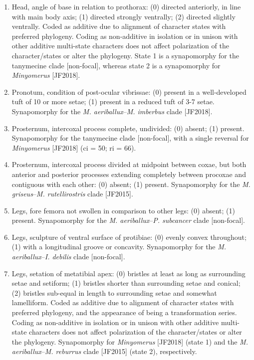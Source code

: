\documentclass[fleqn,10pt,lineno]{wlpeerj} %
\begin{document}
\begin{enumerate}
	 	\item Head, angle of base in relation to prothorax: (0) directed anteriorly, in line with main body axis; (1) directed strongly ventrally; (2) directed slightly ventrally. Coded as additive due to alignment of character states with preferred phylogeny. Coding as non-additive in isolation or in unison with other additive multi-state characters does not affect polarization of the character/states or alter the phylogeny. State 1 is a synapomorphy for the tanymecine clade [non-focal], whereas state 2 is a synapomorphy for \textit{Minyomerus} [JF2018].
	 	
	 	\item Pronotum, condition of post-ocular vibrissae: (0) present in a well-developed tuft of 10 or more setae; (1) present in a reduced tuft of 3-7 setae. Synapomorphy for the \textit{M. aeriballux}--\textit{M. imberbus} clade [JF2018].
	 	
	 	\item Prosternum, intercoxal process complete, undivided: (0) absent; (1) present. Synapomorphy for the tanymecine clade [non-focal], with a single reversal for \textit{Minyomerus} [JF2018] (ci = 50; ri = 66).
	 	
	 	\item Prosternum, intercoxal process divided at midpoint between coxae, but both anterior and posterior processes extending completely between procoxae and contiguous with each other: (0) absent; (1) present. Synapomorphy for the \textit{M. griseus}--\textit{M. rutellirostris} clade [JF2015].
		
	 	\item Legs, fore femora not swollen in comparison to other legs: (0) absent; (1) present. Synapomorphy for the \textit{M. aeriballux}--\textit{P. subcancer} clade [non-focal].
	 	
	 	\item Legs, sculpture of ventral surface of protibiae: (0) evenly convex throughout; (1) with a longitudinal groove or concavity. Synapomorphy for the \textit{M. aeriballux}--\textit{I. debilis} clade [non-focal].
	 	
	 	\item Legs, setation of metatibial apex: (0) bristles at least as long as surrounding setae and setiform; (1) bristles shorter than surrounding setae and conical; (2) bristles sub-equal in length to surrounding setae and somewhat lamelliform. Coded as additive due to alignment of character states with preferred phylogeny, and the appearance of being a transformation series. Coding as non-additive in isolation or in unison with other additive multi-state characters does not affect polarization of the character/states or alter the phylogeny. Synapomorphy for \textit{Minyomerus} [JF2018] (state 1) and the \textit{M. aeriballux}--\textit{M. reburrus} clade [JF2015] (state 2), respectively.
	 	

\end{enumerate}
\end{document}
